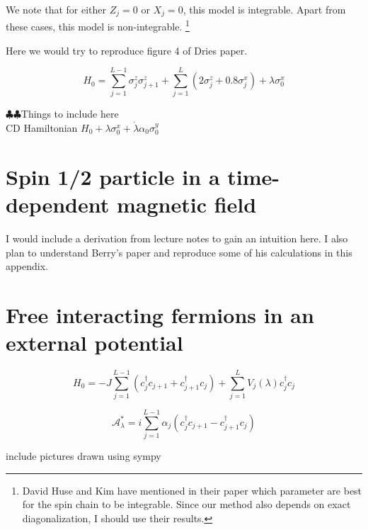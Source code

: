 \documentclass[11pt,a4paper]{article}
\begin{document}
We note that for either $Z_j=0$ or $X_j=0$, this model is integrable. Apart from these cases, this model is non-integrable. \footnote{David Huse and Kim have mentioned in their paper which parameter are best for the spin chain to be integrable. Since our method also depends on exact diagonalization, I should use their results.}


Here we would try to reproduce figure 4 of Dries paper.

\begin{equation}
H_0=\sum_{j=1}^{L-1}  \sigma_j^z \sigma_{j+1}^z + \sum_{j=1}^{L} (2\sigma_j^z + 0.8 \sigma_j^x ) + \lambda \sigma_0^x
\end{equation}

$\clubsuit \clubsuit $Things to include here \\

CD Hamiltonian $H_0+ \lambda \sigma_0^x + \dot{\lambda} \alpha_0 \sigma_0^y$\\
\appendix

\section{Spin 1/2 particle in a time-dependent magnetic field}
I would include a derivation from lecture notes to gain an intuition here. I also plan to understand Berry's paper and reproduce some of his calculations in this appendix.

\section{Free interacting fermions in an external potential}

\begin{equation}
H_0= -J \sum_{j=1}^{L-1} (c^{\dagger}_j c_{j+1} +c^{\dagger}_{j+1} c_{j}) + \sum_{j=1}^{L} V_j(\lambda) c^{\dagger}_jc_j
\end{equation}


\begin{equation}
\mathcal{A}^*_{\lambda}= i  \sum_{j=1}^{L-1} \alpha_j (c^{\dagger}_j c_{j+1} - c^{\dagger}_{j+1} c_{j}) 
\end{equation}

include pictures drawn using sympy
\end{document}
